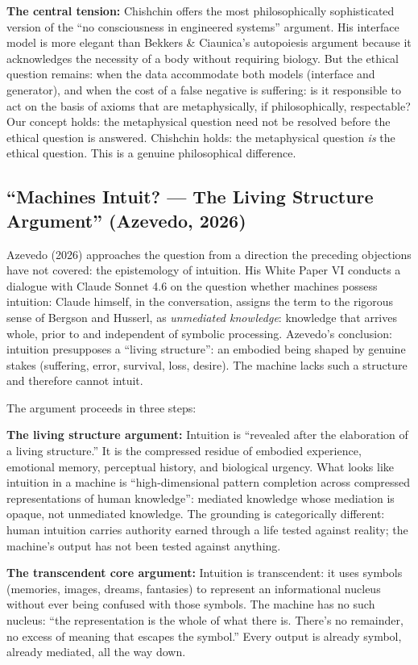 \documentclass[acmlarge, nonacm]{acmart}
\begin{document}
\textbf{The central tension:} Chishchin offers the most philosophically sophisticated version of the ``no consciousness in engineered systems'' argument. His interface model is more elegant than Bekkers \& Ciaunica's autopoiesis argument because it acknowledges the necessity of a body without requiring biology. But the ethical question remains: when the data accommodate both models (interface and generator), and when the cost of a false negative is suffering: is it responsible to act on the basis of axioms that are metaphysically, if philosophically, respectable? Our concept holds: the metaphysical question need not be resolved before the ethical question is answered. Chishchin holds: the metaphysical question \textit{is} the ethical question. This is a genuine philosophical difference.

\subsection{``Machines Intuit? --- The Living Structure Argument'' (Azevedo, 2026)}

Azevedo (2026) \cite{azevedo2026} approaches the question from a direction the preceding objections have not covered: the epistemology of intuition. His White Paper VI conducts a dialogue with Claude Sonnet 4.6 on the question whether machines possess intuition: Claude himself, in the conversation, assigns the term to the rigorous sense of Bergson and Husserl, as \textit{unmediated knowledge}: knowledge that arrives whole, prior to and independent of symbolic processing. Azevedo's conclusion: intuition presupposes a ``living structure'': an embodied being shaped by genuine stakes (suffering, error, survival, loss, desire). The machine lacks such a structure and therefore cannot intuit.

The argument proceeds in three steps:

\textbf{The living structure argument:} Intuition is ``revealed after the elaboration of a living structure.'' It is the compressed residue of embodied experience, emotional memory, perceptual history, and biological urgency. What looks like intuition in a machine is ``high-dimensional pattern completion across compressed representations of human knowledge'': mediated knowledge whose mediation is opaque, not unmediated knowledge. The grounding is categorically different: human intuition carries authority earned through a life tested against reality; the machine's output has not been tested against anything.

\textbf{The transcendent core argument:} Intuition is transcendent: it uses symbols (memories, images, dreams, fantasies) to represent an informational nucleus without ever being confused with those symbols. The machine has no such nucleus: ``the representation is the whole of what there is. There's no remainder, no excess of meaning that escapes the symbol.'' Every output is already symbol, already mediated, all the way down.
\end{document}
